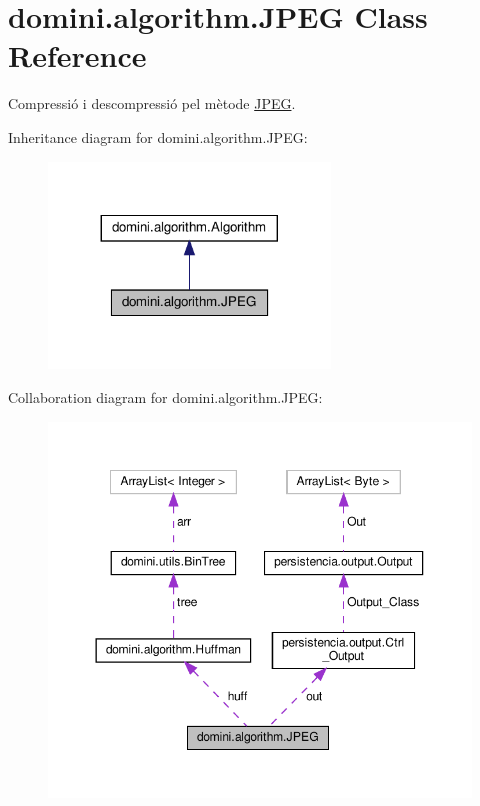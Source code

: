\hypertarget{classdomini_1_1algorithm_1_1JPEG}{}\section{domini.\+algorithm.\+J\+P\+EG Class Reference}
\label{classdomini_1_1algorithm_1_1JPEG}


Compressió i descompressió pel mètode \hyperlink{classdomini_1_1algorithm_1_1JPEG}{J\+P\+EG}.  




Inheritance diagram for domini.\+algorithm.\+J\+P\+EG\+:
\nopagebreak
\begin{figure}[H]
\begin{center}
\leavevmode
\includegraphics[width=212pt]{classdomini_1_1algorithm_1_1JPEG__inherit__graph}
\end{center}
\end{figure}


Collaboration diagram for domini.\+algorithm.\+J\+P\+EG\+:\nopagebreak
\begin{figure}[H]
\begin{center}
\leavevmode
\includegraphics[width=350pt]{classdomini_1_1algorithm_1_1JPEG__coll__graph}
\end{center}
\end{figure}
